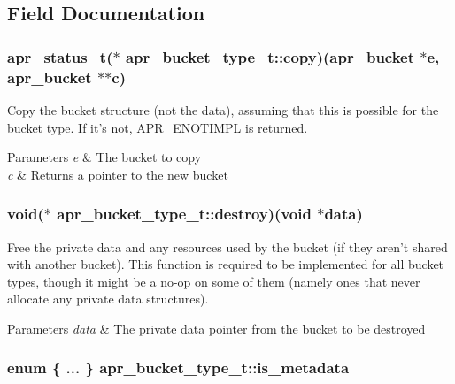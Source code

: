 \subsection{Field Documentation}
\hypertarget{structapr__bucket__type__t_a300d6b15d55a3a1f13eeec7379100c38}{
\subsubsection[{copy}]{\setlength{\rightskip}{0pt plus 5cm}apr\-\_\-status\-\_\-t($\ast$ apr\-\_\-bucket\-\_\-type\-\_\-t\-::copy)({\bf apr\-\_\-bucket} $\ast$e, {\bf apr\-\_\-bucket} $\ast$$\ast$c)}}\label{structapr__bucket__type__t_a300d6b15d55a3a1f13eeec7379100c38}
Copy the bucket structure (not the data), assuming that this is possible for the bucket type. If it's not, A\-P\-R\-\_\-\-E\-N\-O\-T\-I\-M\-P\-L is returned. 
\begin{DoxyParams}{Parameters}
{\em e} & The bucket to copy \\
\hline
{\em c} & Returns a pointer to the new bucket \\
\hline
\end{DoxyParams}
\hypertarget{structapr__bucket__type__t_aa5a8ae7611ba3be480e3fd12ff3ac352}{
\subsubsection[{destroy}]{\setlength{\rightskip}{0pt plus 5cm}void($\ast$ apr\-\_\-bucket\-\_\-type\-\_\-t\-::destroy)(void $\ast$data)}}\label{structapr__bucket__type__t_aa5a8ae7611ba3be480e3fd12ff3ac352}
Free the private data and any resources used by the bucket (if they aren't shared with another bucket). This function is required to be implemented for all bucket types, though it might be a no-\/op on some of them (namely ones that never allocate any private data structures). 
\begin{DoxyParams}{Parameters}
{\em data} & The private data pointer from the bucket to be destroyed \\
\hline
\end{DoxyParams}
\hypertarget{structapr__bucket__type__t_a34cef542a8eee5bb734ba8dcd8329711}{
\subsubsection[{is\-\_\-metadata}]{\setlength{\rightskip}{0pt plus 5cm}enum \{ ... \}   apr\-\_\-bucket\-\_\-type\-\_\-t\-::is\-\_\-metadata}}\label{structapr__bucket__type__t_a34cef542a8eee5bb734ba8dcd8329711}
